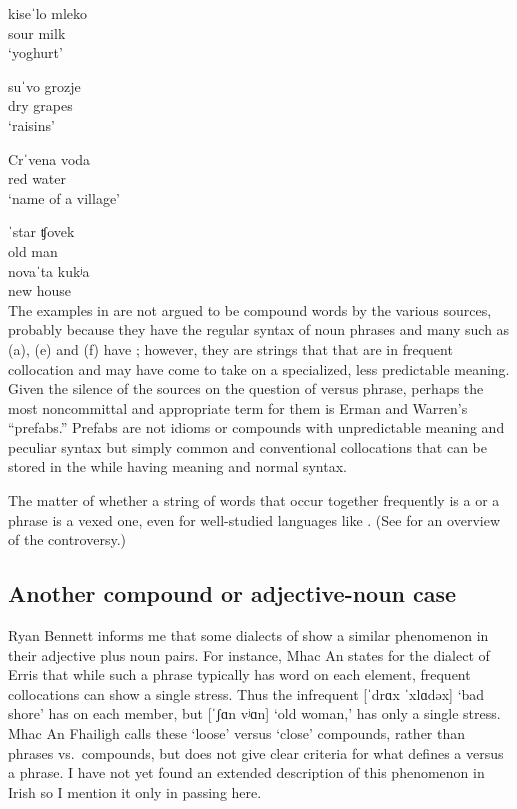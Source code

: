 \documentclass[output=paper,
modfonts
]{LSP/langsci}
\begin{document}
\begin{exe}
	\ex \label{ex:kaisse:19b} \gll kiseˈlo mleko\\
	sour milk\\
	
	\glt ‘yoghurt’
	
	\ex \label{ex:kaisse:19c} suˈvo grozje\\
	dry grapes\\
	\glt ‘raisins’

	\ex \label{ex:kaisse:19d} Crˈvena voda\\
	red water\\
	\glt ‘name of a village’

	\ex \label{ex:kaisse:19e} \gll ˈstar  ʧovek\\ 
	old man\\
	
	\ex \label{ex:kaisse:19f} \gll novaˈta kukʲa\\
	new house\\
	\z
\z
The examples in  are not argued to be compound words by the various sources, probably because they have the regular syntax of noun phrases and many such as (a), (e) and (f) have  ; however, they are strings that that are in frequent collocation and may have come to take on a specialized, less predictable meaning. Given the silence of the sources on the question of  versus phrase, perhaps the most noncommittal and appropriate term for them is Erman and Warren’s \citeyearpar{erman2000} “prefabs.” Prefabs are not idioms or  compounds with unpredictable meaning and peculiar syntax but simply common and conventional collocations that can be stored in the  while having  meaning and normal syntax. 

The matter of whether a string of words that occur together frequently is a  or a phrase is a vexed one, even for well-studied languages like . (See \citealt{plag2008} for an overview of the controversy.) 

\subsection{Another compound or adjective-noun case}\label{sec:kaisse:4.3}

Ryan Bennett informs me that some dialects of  show a similar phenomenon in their adjective plus noun pairs. For instance, Mhac An \citet{fhailigh1968} states for the dialect of Erris that while such a phrase typically has word  on each element, frequent collocations can show a single stress. Thus the infrequent [ˈdrɑx ˈxlɑdəx] `bad shore' has  on each member, but [ˈʃɑn vʲɑn] `old woman,' has only a single stress. Mhac An Fhailigh calls these ‘loose’ versus ‘close’ compounds, rather than phrases vs.\ compounds, but does not give clear criteria for what defines a  versus a phrase. I have not yet found an extended description of this phenomenon in Irish so I mention it  only in passing here. 


\end{exe}
\end{document}
